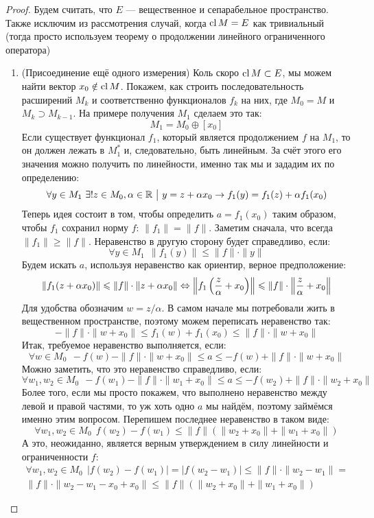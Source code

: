 \begin{proof}
	Будем считать, что $E$ --- вещественное и сепарабельное пространство. Также исключим из рассмотрения случай, когда $\operatorname{cl} M = E$ как тривиальный (тогда просто используем теорему о продолжении линейного ограниченного оператора)
	\begin{enumerate}
		\item (Присоединение ещё одного измерения) Коль скоро $\operatorname{cl} M \subset E$, мы можем найти вектор $x_0 \notin \operatorname{cl} M$. Покажем, как строить последовательность расширений $M_k$ и соответственно функционалов $f_k$ на них, где $M_0 = M$ и $M_k \supset M_{k - 1}$. На примере получения $M_1$ сделаем это так:
		\[
			M_1 = M_0 \oplus [x_0]
		\]
		Если существует функционал $f_1$, который является продолжением $f$ на $M_1$, то он должен лежать в $M_1^*$ и, следовательно, быть линейным. За счёт этого его значения можно получить по линейности, именно так мы и зададим их по определению:
		\[
			\forall y \in M_1\ \exists! z \in M_0, \alpha \in \mathbb{R} \ \big|\  y = z + \alpha x_0 \rightarrow f_1(y) = f_1(z) + \alpha f_1(x_0)
		\]
		Теперь идея состоит в том, чтобы определить $a = f_1(x_0)$ таким образом, чтобы $f_1$ сохранил норму $f$: $\|f_1\| = \|f\|$. Заметим сначала, что всегда $\|f_1\| \ge \|f\|$. Неравенство в другую сторону будет справедливо, если:
		\[
			\forall y \in M_1\ \ \|f_1(y)\| \le \|f\| \cdot \|y\|
		\]
		Будем искать $a$, используя неравенство как ориентир, верное предположение:
		\[
			\|f_1(z + \alpha x_0)\| \leqslant \|f\| \cdot \|z + \alpha x_0\| \Leftrightarrow \left\|f_1\left(\frac{z}{\alpha} + x_0\right)\right\| \leqslant \|f\| \cdot \left\|\frac{z}{\alpha} + x_0\right\|
		\]
		Для удобства обозначим $w = z / \alpha$. В самом начале мы потребовали жить в вещественном пространстве, поэтому можем переписать неравенство так:
		\[
			-\|f\| \cdot \|w + x_0\| \le f_1(w) + f_1(x_0) \le \|f\| \cdot \|w + x_0\|
		\]
		Итак, требуемое неравенство выполняется, если:
		\[
			\forall w \in M_0\ \ -f(w) - \|f\| \cdot \|w + x_0\| \le a \le -f(w) + \|f\| \cdot \|w + x_0\|
		\]
		Можно заметить, что это неравенство справедливо, если:
		\[
			\forall w_1, w_2 \in M_0\ \ -f(w_1) - \|f\| \cdot \|w_1 + x_0\| \le a \le -f(w_2) + \|f\| \cdot \|w_2 + x_0\|
		\]
		Более того, если мы просто покажем, что выполнено неравенство между левой и правой частями, то уж хоть одно $a$ мы найдём, поэтому займёмся именно этим вопросом. Перепишем последнее неравенство в таком виде:
		\[
			\forall w_1, w_2 \in M_0\ \ f(w_2) - f(w_1) \le \|f\|(\|w_2 + x_0\| + \|w_1 + x_0\|)
		\]
		А это, неожиданно, является верным утверждением в силу линейности и ограниченности $f$:
		\begin{multline*}
			\forall w_1, w_2 \in M_0\ \ |f(w_2) - f(w_1)| = |f(w_2 - w_1)| \le \|f\| \cdot \|w_2 - w_1\| =
			\\
			\|f\| \cdot \|w_2 - w_1 - x_0 + x_0\| \le \|f\|(\|w_2 + x_0\| + \|w_1 + x_0\|)
		\end{multline*}
		

\end{enumerate}
\end{proof}

